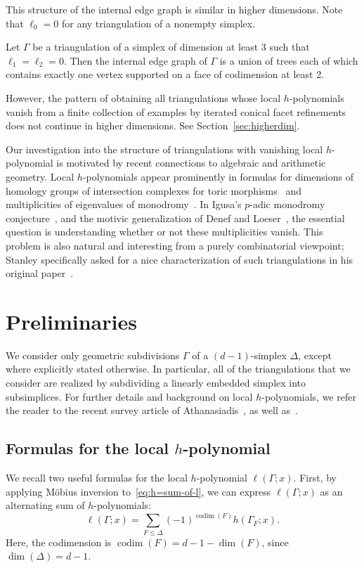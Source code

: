 \documentclass[ALCO,ThmDefs,Unicode,epreuves]{cedram}
\DeclareMathOperator{\codim}{codim}
\begin{document}
This structure of the internal edge graph is similar in higher dimensions. Note that $\ell_0 = 0$ for any triangulation of a nonempty simplex.

\begin{theorem} \label{thm:internaledgegraph}
Let $\Gamma$ be a triangulation of a simplex of dimension at least 3 such that $\ell_1 = \ell_2 = 0$. Then the internal edge graph of $\Gamma$ is a union of trees each of which contains exactly one vertex supported on a face of codimension at least 2.
\end{theorem}

\noindent However, the pattern of obtaining all triangulations whose local $h$-polynomials vanish from a finite collection of examples by iterated conical facet refinements does not continue in higher dimensions. See Section~\ref{sec:higherdim}.

Our investigation into the structure of triangulations with vanishing local $h$-polynomial
is motivated by recent connections to algebraic and arithmetic geometry. 
Local $h$-polynomials appear prominently in formulas for dimensions of homology groups of
intersection complexes for toric morphisms~\cite{deCataldoMiglioriniMustata18} and 
multiplicities of eigenvalues of monodromy~\cite{KatzStapledon16, Stapledon17}. 
In Igusa's $p$-adic monodromy conjecture~\cite{Igusa75}, and the motivic generalization of
Denef and Loeser~\cite{DenefLoeser98}, the essential question is understanding whether or
not these multiplicities vanish. This problem is also natural and interesting from a
purely combinatorial viewpoint; Stanley specifically asked for a nice characterization of 
such triangulations in his original paper~\cite[Problem~4.13]{Stanley92}. 



\section{Preliminaries}

We consider only geometric subdivisions $\Gamma$ of a $(d-1)$-simplex $\Delta$, except where explicitly stated otherwise. In particular, all of the triangulations that we consider are realized by subdividing a linearly embedded simplex into subsimplices. For further details and background on local $h$-polynomials, we refer the reader to the recent survey article of Athanasiadis~\cite{Athanasiadis16}, as well as~\cite{Stanley92}.

\subsection{Formulas for the local \texorpdfstring{$h$}{h}-polynomial}
We recall two useful formulas for the local $h$-polynomial $\ell(\Gamma;x)$. First, by applying M{\"o}bius inversion to~\eqref{eq:h=sum-of-l}, we can express $\ell(\Gamma;x)$ as an alternating sum of $h$-polynomials:
\begin{equation} \label{eq:alternating sum}
\ell(\Gamma;x) = \sum_{F \leq \Delta}(-1)^{\codim (F)} h(\Gamma_F;x).
\end{equation}
Here, the codimension is $\codim(F) = d - 1 - \dim(F)$, since $\dim(\Delta) = d-1$.
\end{document}
